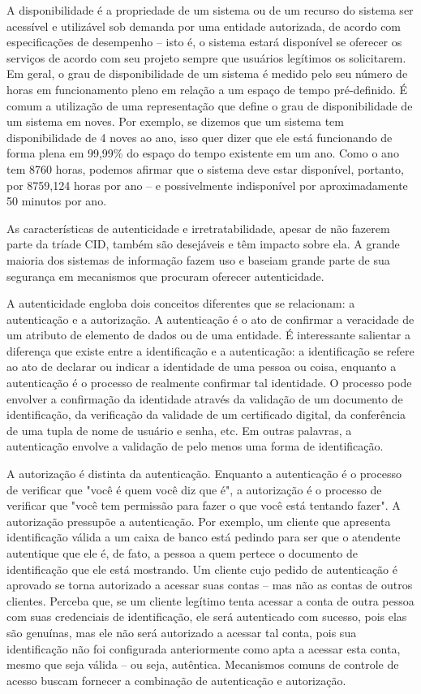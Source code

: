 \documentclass[
	10pt,				%
	openright,			%
	twoside,			%
	a5paper,			%
	english,			%
	french,				%
	spanish,			%
	brazil,				%
	sumario=tradicional
]{abntex2}
\begin{document}
A disponibilidade é a propriedade de um sistema ou de um recurso do sistema ser acessível e utilizável sob demanda por uma entidade autorizada, de acordo com especificações de desempenho -- isto é, o sistema estará disponível se oferecer os serviços de acordo com seu projeto sempre que usuários legítimos os solicitarem. Em geral, o grau de disponibilidade de um sistema é medido pelo seu número de horas em funcionamento pleno em relação a um espaço de tempo pré-definido. É comum a utilização de uma representação que define o grau de disponibilidade de um sistema em noves. Por exemplo, se dizemos que um sistema tem disponibilidade de 4 noves ao ano, isso quer dizer que ele está funcionando de forma plena em 99,99\% do espaço do tempo existente em um ano. Como o ano tem 8760 horas, podemos afirmar que o sistema deve estar disponível, portanto, por 8759,124 horas por ano -- e possivelmente indisponível por aproximadamente 50 minutos por ano.

As características de autenticidade e irretratabilidade, apesar de não fazerem parte da tríade CID, também são desejáveis e têm impacto sobre ela. A grande maioria dos sistemas de informação fazem uso e baseiam grande parte de sua segurança em mecanismos que procuram oferecer autenticidade.

A autenticidade engloba dois conceitos diferentes que se relacionam: a autenticação e a autorização. A autenticação é o ato de confirmar a veracidade de um atributo de elemento de dados ou de uma entidade. É interessante salientar a diferença que existe entre a identificação e a autenticação: a identificação se refere ao ato de declarar ou indicar a identidade de uma pessoa ou coisa, enquanto a autenticação é o processo de realmente confirmar tal identidade. O processo pode envolver a confirmação da identidade através da validação de um documento de identificação, da verificação da validade de um certificado digital, da conferência de uma tupla de nome de usuário e senha, etc. Em outras palavras, a autenticação envolve a validação de pelo menos uma forma de identificação.

A autorização é distinta da autenticação. Enquanto a autenticação é o processo de verificar que "você é quem você diz que é", a autorização é o processo de verificar que "você tem permissão para fazer o que você está tentando fazer". A autorização pressupõe a autenticação. Por exemplo, um cliente que apresenta identificação válida a um caixa de banco está pedindo para ser que o atendente autentique que ele é, de fato, a pessoa a quem pertece o documento de identificação que ele está mostrando. Um cliente cujo pedido de autenticação é aprovado se torna autorizado a acessar suas contas -- mas não as contas de outros clientes. 	Perceba que, se um cliente legítimo tenta acessar a conta de outra pessoa com suas credenciais de identificação, ele será autenticado com sucesso, pois elas são genuínas, mas ele não será autorizado a acessar tal conta, pois sua identificação não foi configurada anteriormente como apta a acessar esta conta, mesmo que seja válida -- ou seja, autêntica.
Mecanismos comuns de controle de acesso buscam fornecer a combinação de autenticação e autorização.
\end{document}
